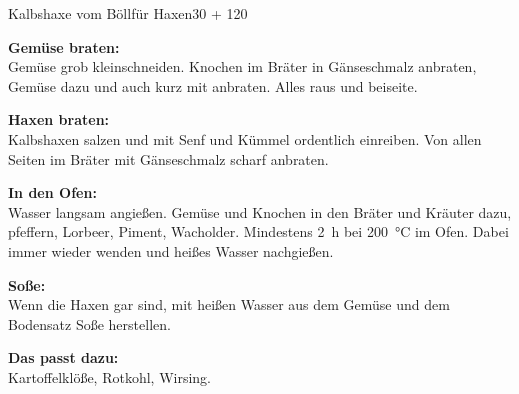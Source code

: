 \begin{MyRecipe}{Kalbshaxe vom Böll}{für  Haxen}{\SI{30}{\minuteprime} + \SI{120}{\minuteprime}}


\textbf{Gemüse braten:}\\
Gemüse grob kleinschneiden. Knochen im Bräter in Gänseschmalz anbraten, Gemüse dazu und auch kurz mit anbraten. Alles raus und beiseite.\par\bigskip


\textbf{Haxen braten:}\\
Kalbshaxen salzen und mit Senf und Kümmel ordentlich einreiben. Von allen Seiten im Bräter mit Gänseschmalz scharf anbraten.\par\bigskip


\textbf{In den Ofen:}\\
Wasser langsam angießen. Gemüse und Knochen in den Bräter und Kräuter dazu, pfeffern, Lorbeer, Piment, Wacholder. Mindestens \SI{2}{\hour} bei \SI{200}{\degreeCelsius} im Ofen. Dabei immer wieder wenden und
heißes Wasser nachgießen.\par\bigskip

\textbf{Soße:}\\
Wenn die Haxen gar sind, mit heißen Wasser aus dem Gemüse und dem Bodensatz Soße herstellen.\par\bigskip

\textbf{Das passt dazu:}\\
Kartoffelklöße, Rotkohl, Wirsing.
	

			
\end{MyRecipe}